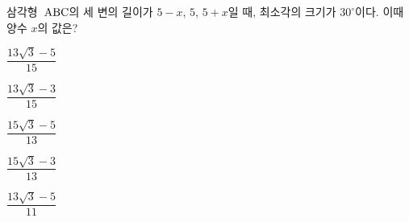 삼각형~$\mathrm{ABC}$의 세 변의 길이가 $5-x$, $5$, $5+x$일 때, 최소각의 크기가 $30^\circ$이다. 이때 양수 $x$의 값은?
\begin{choices32}{\rule[-3ex]{0pt}{8ex}$\dfrac{13\sqrt{3}-5}{15}$}{\rule[-3ex]{0pt}{8ex}$\dfrac{13\sqrt{3}-3}{15}$}{\rule[-3ex]{0pt}{8ex}$\dfrac{15\sqrt{3}-5}{13}$}{\rule[-3ex]{0pt}{8ex}$\dfrac{15\sqrt{3}-3}{13}$}{\rule[-3ex]{0pt}{8ex}$\dfrac{13\sqrt{3}-5}{11}$}\end{choices32}
